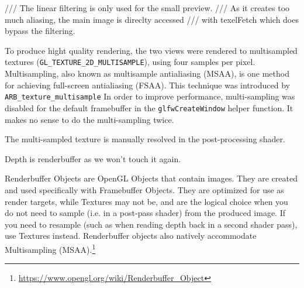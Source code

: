 \documentclass[a4paper,11pt]{article}
\begin{document}
        /// The linear filtering is only used for the small preview.
        /// As it creates too much aliasing, the main image is direclty accessed
        /// with texelFetch which does bypass the filtering.

To produce hight quality rendering, the two views were rendered to multisampled textures (\texttt{GL\_TEXTURE\_2D\_MULTISAMPLE}), using four samples per pixel. Multisampling, also known as multisample antialiasing (MSAA), is one method for achieving full-screen antialiasing (FSAA). This technique was introduced by \texttt{ARB\_texture\_multisample} In order to improve performance, multi-sampling was disabled for the default framebuffer in the \texttt{glfwCreateWindow} helper function. It makes no sense to do the multi-sampling twice.

The multi-sampled texture is manually resolved in the post-processing shader.

Depth is renderbuffer as we won't touch it again.

Renderbuffer Objects are OpenGL Objects that contain images. They are created and used specifically with Framebuffer Objects. They are optimized for use as render targets, while Textures may not be, and are the logical choice when you do not need to sample (i.e. in a post-pass shader) from the produced image. If you need to resample (such as when reading depth back in a second shader pass), use Textures instead. Renderbuffer objects also natively accommodate Multisampling (MSAA).\footnote{\url{https://www.opengl.org/wiki/Renderbuffer\_Object}}
\end{document}

